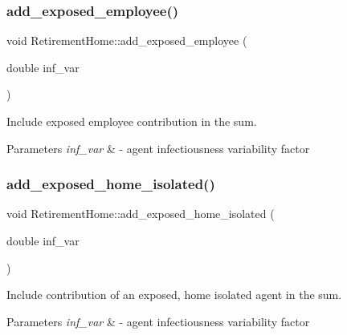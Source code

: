 \subsubsection{\texorpdfstring{add\+\_\+exposed\+\_\+employee()}{add\_exposed\_employee()}}
{\footnotesize\ttfamily void Retirement\+Home\+::add\+\_\+exposed\+\_\+employee (\begin{DoxyParamCaption}\item[{double}]{inf\+\_\+var }\end{DoxyParamCaption})\hspace{0.3cm}{\ttfamily [inline]}}



Include exposed employee contribution in the sum. 


\begin{DoxyParams}{Parameters}
{\em inf\+\_\+var} & -\/ agent infectiousness variability factor \\
\hline
\end{DoxyParams}
\mbox{\label{classRetirementHome_aaa3cd3799f2c48c92d5265bcfe514640}} 
\subsubsection{\texorpdfstring{add\+\_\+exposed\+\_\+home\+\_\+isolated()}{add\_exposed\_home\_isolated()}}
{\footnotesize\ttfamily void Retirement\+Home\+::add\+\_\+exposed\+\_\+home\+\_\+isolated (\begin{DoxyParamCaption}\item[{double}]{inf\+\_\+var }\end{DoxyParamCaption})\hspace{0.3cm}{\ttfamily [inline]}}



Include contribution of an exposed, home isolated agent in the sum. 


\begin{DoxyParams}{Parameters}
{\em inf\+\_\+var} & -\/ agent infectiousness variability factor \\
\hline
\end{DoxyParams}
\mbox{\label{classRetirementHome_ab2a24b8583ae1e34cc8baf2d04c27116}} 
